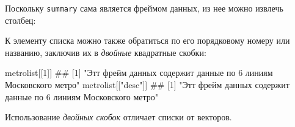 \documentclass[]{book}
\newenvironment{Shaded}{\begin{snugshade}}{\end{snugshade}}
\newcommand{\DecValTok}[1]{\textcolor[rgb]{0.00,0.00,0.81}{#1}}
\newcommand{\StringTok}[1]{\textcolor[rgb]{0.31,0.60,0.02}{#1}}
\newcommand{\OperatorTok}[1]{\textcolor[rgb]{0.81,0.36,0.00}{\textbf{#1}}}
\newcommand{\NormalTok}[1]{#1}
\begin{document}
Поскольку \texttt{summary} сама является фреймом данных, из нее можно
извлечь столбец:

\begin{Shaded}
\end{Shaded}

К элементу списка можно также обратиться по его порядковому номеру или
названию, заключив их в \emph{двойные} квадратные скобки:

\begin{Shaded}
\begin{Highlighting}[]
\NormalTok{metrolist[[}\DecValTok{1}\NormalTok{]]}
\NormalTok{## [1] "Этт фрейм данных содержит данные по 6 линиям Московского метро"}
\NormalTok{metrolist[[}\StringTok{"desc"}\NormalTok{]]}
\NormalTok{## [1] "Этт фрейм данных содержит данные по 6 линиям Московского метро"}
\end{Highlighting}
\end{Shaded}

Использование \emph{двойных скобок} отличает списки от векторов.


\end{document}
